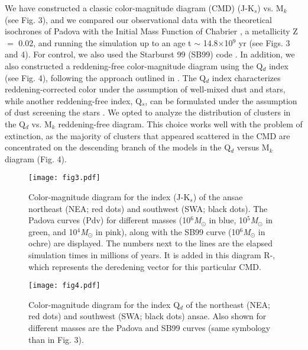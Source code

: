 \documentclass[baaa]{baaa}
\begin{document}
We have constructed a classic color-magnitude diagram (CMD) (J-K$_{s}$) vs. M$_{k}$ (see Fig. 3), and we compared our observational data with the theoretical isochrones of Padova \citep{2008A&A...482..883M} with the Initial Mass Function of Chabrier \citep{2003PASP..115..763C}, a metallicity Z $=$ 0.02, and running the simulation up to an age t $\sim$ 14.8$\times$10$^9$ yr (see Figs. 3 and 4). For control, we also used the Starburst 99 (SB99) code \citep{1999ApJS..123....3L}. In addition, we also constructed a reddening-free color-magnitude diagram using the Q$_{d}$ index \citep[]{1998A&A...336..433I,1992ApJ...393..611W} (see Fig. 4), following the approach outlined in \citet{2012A&A...542A..39G}. The Q$_{d}$ index characterizes reddening-corrected color under the assumption of well-mixed dust and stars, while another reddening-free index, Q$_{s}$, can be formulated under the assumption of dust screening the stars \citep{2005ApJ...619..931I}.
We opted to analyze the distribution of clusters in the Q$_{d}$ vs. M$_{k}$ reddening-free diagram. This choice works well with the problem of extinction, as the majority of clusters that appeared scattered in the CMD are concentrated on the descending branch of the models in the Q$_{d}$ versus M$_{k}$ diagram (Fig. 4).



\begin{figure}[!t]
\centering
\texttt{[image: fig3.pdf]}
\caption{Color-magnitude diagram for the index (J-K$_{s}$) of the ansae northeast (NEA; red dots) and southwest (SWA; black dots). The Padova curves (Pdv) for different masses (10$^{6}$\textit{M$_{\odot}$} in blue, 10$^{5}$\textit{M$_{\odot}$} in green, and 10$^{4}$\textit{M$_{\odot}$} in pink), along with the SB99 curve (10$^{6}$\textit{M$_{\odot}$} in ochre) are displayed. The numbers next to the lines are the elapsed simulation times in millions of years. It is added in this diagram R-, which represents the deredening vector for this particular CMD.}
\label{Figura}
\end{figure}

\begin{figure}[!t]
\centering
\texttt{[image: fig4.pdf]}
\caption{Color-magnitude diagram for the index Q$_{d}$ of the northeast (NEA; red dots) and southwest (SWA; black dots) ansae. Also shown for different masses are the Padova and SB99 curves (same symbology than in Fig. 3).}
\label{Figura}
\end{figure}
\end{document}
